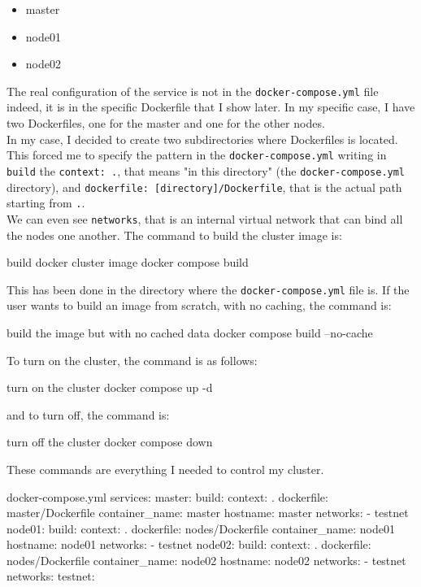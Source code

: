 \begin{itemize}
    \item master
    \item node01
    \item node02
\end{itemize}

The real configuration of the service is not in the \texttt{docker-compose.yml} file indeed, it is in the specific Dockerfile that I show later. In my specific case, I have two Dockerfiles, one for the master and one for the other nodes. \\
In my case, I decided to create two subdirectories where Dockerfiles is located. This forced me to specify the pattern in the \texttt{docker-compose.yml} writing in \texttt{build} the \texttt{context: .}, that means "in this directory" (the \texttt{docker-compose.yml} directory), and \texttt{dockerfile: [directory]/Dockerfile}, that is the actual path starting from \texttt{.}. \\
We can even see \texttt{networks}, that is an internal virtual network that can bind all the nodes one another.
The command to build the cluster image is: 

\begin{codice}[style=bashstyle]{build docker cluster image}
docker compose build
\end{codice}

This has been done in the directory where the \texttt{docker-compose.yml} file is. If the user wants to build an image from scratch, with no caching, the command is:

\begin{codice}[style=bashstyle]{build the image but with no cached data}
docker compose build --no-cache
\end{codice}

To turn on the cluster, the command is as follows:

\begin{codice}[style=bashstyle]{turn on the cluster}
docker compose up -d
\end{codice}

and to turn off, the command is:

\begin{codice}[style=bashstyle]{turn off the cluster}
docker compose down
\end{codice}

These commands are everything I needed to control my cluster.

\begin{codice}[style=bashstyle]{docker-compose.yml}
services:
  master:
    build:
      context: .
      dockerfile: master/Dockerfile
    container_name: master
    hostname: master
    networks:
      - testnet
  node01:
    build:
      context: .
      dockerfile: nodes/Dockerfile
    container_name: node01
    hostname: node01
    networks:
      - testnet
  node02:
    build:
      context: .
      dockerfile: nodes/Dockerfile
    container_name: node02
    hostname: node02
    networks:
      - testnet
networks:
  testnet:
\end{codice}

